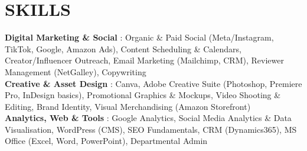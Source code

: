 \documentclass[letterpaper,11pt]{article}
\begin{document}
\section{SKILLS}
 \begin{itemize}[leftmargin=0in, label={}]
    \small{\item{
     \textbf{Digital Marketing \& Social} {: Organic \& Paid Social (Meta/Instagram, TikTok, Google, Amazon Ads), Content Scheduling \& Calendars, Creator/Influencer Outreach, Email Marketing (Mailchimp, CRM), Reviewer Management (NetGalley), Copywriting} \\
     \textbf{Creative \& Asset Design}   {: Canva, Adobe Creative Suite (Photoshop, Premiere Pro, InDesign basics), Promotional Graphics \& Mockups, Video Shooting \& Editing, Brand Identity, Visual Merchandising (Amazon Storefront)} \\
     \textbf{Analytics, Web \& Tools}    {: Google Analytics, Social Media Analytics \& Data Visualisation, WordPress (CMS), SEO Fundamentals, CRM (Dynamics365), MS Office (Excel, Word, PowerPoint), Departmental Admin} \\
    }}
 \end{itemize}


\end{document}
